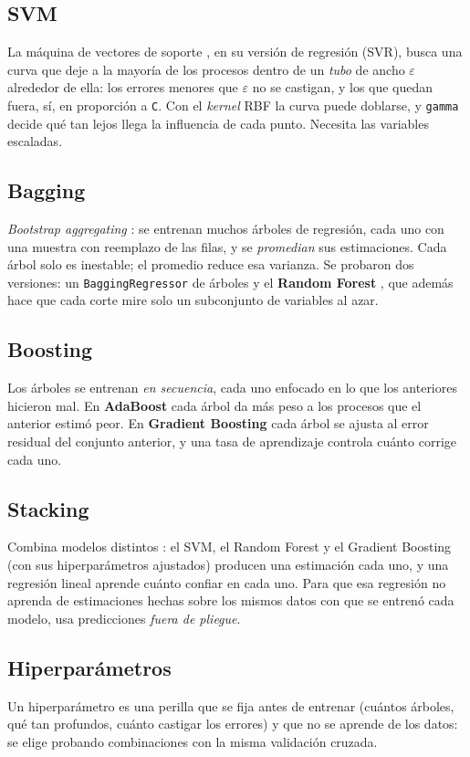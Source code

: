 \documentclass[11pt,a4paper]{article}
\begin{document}
\subsection{SVM}
La máquina de vectores de soporte \cite{cortes1995}, en su versión de regresión (SVR), busca una curva que deje a la
mayoría de los procesos dentro de un \emph{tubo} de ancho $\varepsilon$ alrededor de ella: los errores menores que
$\varepsilon$ no se castigan, y los que quedan fuera, sí, en proporción a \texttt{C}. Con el \emph{kernel} RBF la curva
puede doblarse, y \texttt{gamma} decide qué tan lejos llega la influencia de cada punto. Necesita las variables escaladas.

\subsection{Bagging}
\emph{Bootstrap aggregating} \cite{breiman1996}: se entrenan muchos árboles de regresión, cada uno con una muestra con
reemplazo de las filas, y se \emph{promedian} sus estimaciones. Cada árbol solo es inestable; el promedio reduce esa
varianza. Se probaron dos versiones: un \texttt{BaggingRegressor} de árboles y el \textbf{Random Forest}
\cite{breiman2001}, que además hace que cada corte mire solo un subconjunto de variables al azar.

\subsection{Boosting}
Los árboles se entrenan \emph{en secuencia}, cada uno enfocado en lo que los anteriores hicieron mal. En
\textbf{AdaBoost} \cite{freund1997} cada árbol da más peso a los procesos que el anterior estimó peor. En
\textbf{Gradient Boosting} \cite{friedman2001} cada árbol se ajusta al error residual del conjunto anterior, y una tasa de
aprendizaje controla cuánto corrige cada uno.

\subsection{Stacking}
Combina modelos distintos \cite{wolpert1992}: el SVM, el Random Forest y el Gradient Boosting (con sus hiperparámetros
ajustados) producen una estimación cada uno, y una regresión lineal aprende cuánto confiar en cada uno. Para que esa
regresión no aprenda de estimaciones hechas sobre los mismos datos con que se entrenó cada modelo, usa predicciones
\emph{fuera de pliegue}.

\subsection{Hiperparámetros}
Un hiperparámetro es una perilla que se fija antes de entrenar (cuántos árboles, qué tan profundos, cuánto castigar los
errores) y que no se aprende de los datos: se elige probando combinaciones con la misma validación cruzada.
\end{document}
